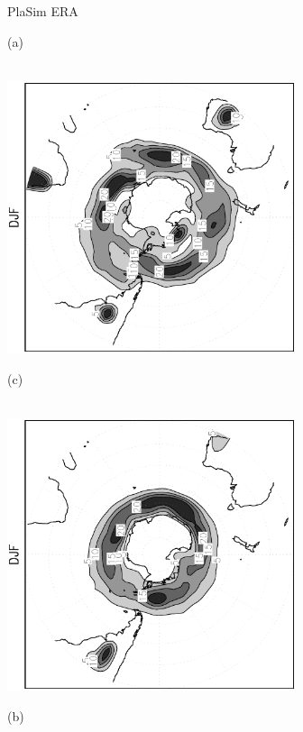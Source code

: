 \documentclass[12pt,a4paper,twoside,openright,headinclude,liststotoc,bibtotoc]{scrreprt}
\begin{document}
\begin{figure}[c]
\hspace{3.8cm}PlaSim \vspace{0.2cm} \hspace{7.3cm} ERA \\
\parbox{8.5cm}{\hspace{0.95cm}\begin{scriptsize}(a)\end{scriptsize} \vspace{-0.5cm} \\
\includegraphics[height=8.0cm,angle=-90]
{eps/cycldensity_PLASIM_T21_45DJF_SH.eps}
}
\parbox{8.5cm}{\hspace{0.95cm}\begin{scriptsize}(c)\end{scriptsize} \vspace{-0.5cm} \\
\includegraphics[height=8.0cm,angle=-90]
{eps/cycldensity_ERA40_T21_45DJF_SH.eps}
}
\parbox{8.5cm}{\hspace{0.95cm}\begin{scriptsize}(b)\end{scriptsize} \vspace{-0.5cm} \\
}
\end{figure}
\end{document}
